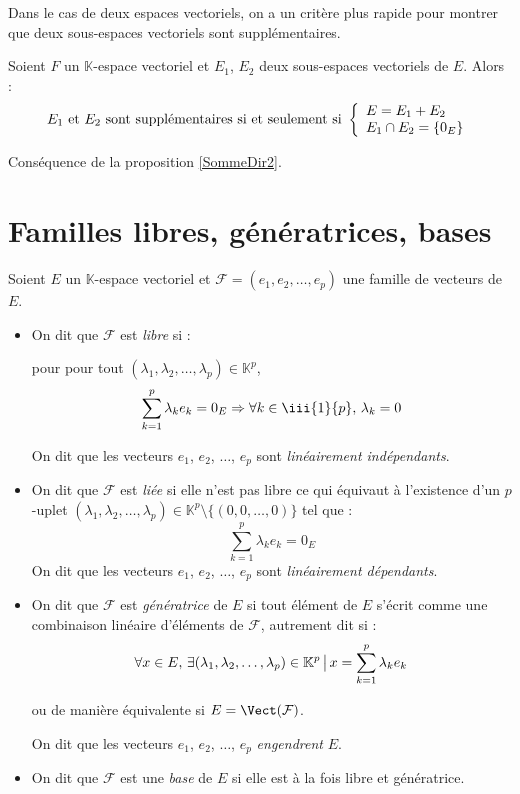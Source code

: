 \documentclass[french,11pt,twoside]{VcCours}
\begin{document}
Dans le cas de deux espaces vectoriels, on a un critère plus rapide pour montrer que deux sous-espaces vectoriels sont supplémentaires.

 \begin{Proposition}{}
 Soient $F$ un $\mathbb{K}$-espace vectoriel et $E_1$, $E_2$ deux sous-espaces vectoriels de $E$. Alors :
 $$ E_1 \hbox{ et } E_2 \hbox{ sont supplémentaires si et seulement si } \left\lbrace\begin{array}{l}
 E=E_1+ E_2 \\
 E_1 \cap E_2 = \lbrace 0_E \rbrace
 \end{array}\right.$$
 \end{Proposition}
 
 \begin{Demonstration}{}
 Conséquence de la proposition \ref{SommeDir2}.
 \end{Demonstration}

 
 \section{Familles libres, génératrices, bases}
 
 \begin{Definition}{}
Soient $E$ un $\mathbb{K}$-espace vectoriel et $\mathcal{F} = (e_1, e_2, \ldots, e_p)$ une famille de vecteurs de $E$.

\begin{itemize}
\item On dit que $\mathcal{F}$ est \emph{libre} si  :

pour pour tout $(\lambda_1, \lambda_2, \ldots, \lambda_p) \in \mathbb{K}^p$,
$$ \sum_{k=1}^p \lambda_k e_k = 0_E \Rightarrow \forall k \in \iii{1}{p}, \, \lambda_k = 0$$

On dit que les vecteurs $e_1$, $e_2$, $\ldots$, $e_p$ sont \emph{linéairement indépendants}.
\item On dit que $\mathcal{F}$ est \emph{liée} si elle n'est pas libre ce qui équivaut à l'existence d'un $p$-uplet \newline $(\lambda_1, \lambda_2, \ldots, \lambda_p) \in \mathbb{K}^p \setminus \lbrace (0,0, \ldots,0) \rbrace$ tel que :
$$ \sum_{k=1}^p \lambda_k e_k = 0_E$$
On dit que les vecteurs $e_1$, $e_2$, $\ldots$, $e_p$ sont \emph{linéairement dépendants}.
\item On dit que $\mathcal{F}$ est \emph{génératrice} de $E$ si tout élément de $E$ s'écrit comme une combinaison linéaire d'éléments de $\mathcal{F}$, autrement dit si :
$$ \forall x \in E, \, \exists (\lambda_1, \lambda_2, \ldots, \lambda_p) \in \mathbb{K}^p \, \big{\vert} \, x=\sum_{k=1}^p \lambda_k e_k$$


ou de manière équivalente si $E = \Vect(\mathcal{F})$.

On dit que les vecteurs $e_1$, $e_2$, $\ldots$, $e_p$ \emph{engendrent} $E$.
\item On dit que $\mathcal{F}$ est une \emph{base} de $E$ si elle est à la fois libre et génératrice.
\end{itemize}
\end{Definition}
\end{document}
